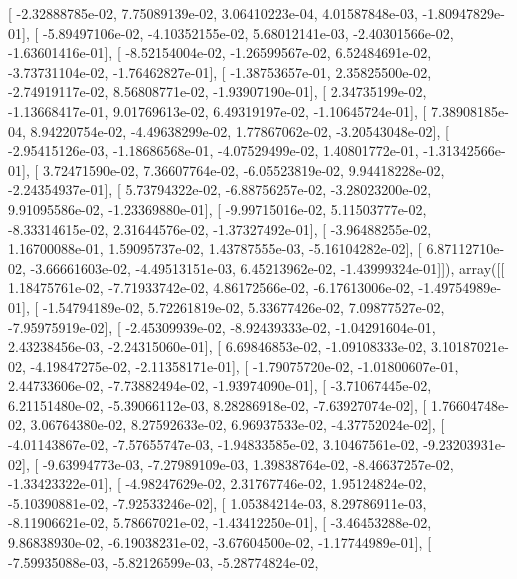 \documentclass{article}
\begin{document}
       [ -2.32888785e-02,   7.75089139e-02,   3.06410223e-04,
          4.01587848e-03,  -1.80947829e-01],
       [ -5.89497106e-02,  -4.10352155e-02,   5.68012141e-03,
         -2.40301566e-02,  -1.63601416e-01],
       [ -8.52154004e-02,  -1.26599567e-02,   6.52484691e-02,
         -3.73731104e-02,  -1.76462827e-01],
       [ -1.38753657e-01,   2.35825500e-02,  -2.74919117e-02,
          8.56808771e-02,  -1.93907190e-01],
       [  2.34735199e-02,  -1.13668417e-01,   9.01769613e-02,
          6.49319197e-02,  -1.10645724e-01],
       [  7.38908185e-04,   8.94220754e-02,  -4.49638299e-02,
          1.77867062e-02,  -3.20543048e-02],
       [ -2.95415126e-03,  -1.18686568e-01,  -4.07529499e-02,
          1.40801772e-01,  -1.31342566e-01],
       [  3.72471590e-02,   7.36607764e-02,  -6.05523819e-02,
          9.94418228e-02,  -2.24354937e-01],
       [  5.73794322e-02,  -6.88756257e-02,  -3.28023200e-02,
          9.91095586e-02,  -1.23369880e-01],
       [ -9.99715016e-02,   5.11503777e-02,  -8.33314615e-02,
          2.31644576e-02,  -1.37327492e-01],
       [ -3.96488255e-02,   1.16700088e-01,   1.59095737e-02,
          1.43787555e-03,  -5.16104282e-02],
       [  6.87112710e-02,  -3.66661603e-02,  -4.49513151e-03,
          6.45213962e-02,  -1.43999324e-01]]), array([[  1.18475761e-02,  -7.71933742e-02,   4.86172566e-02,
         -6.17613006e-02,  -1.49754989e-01],
       [ -1.54794189e-02,   5.72261819e-02,   5.33677426e-02,
          7.09877527e-02,  -7.95975919e-02],
       [ -2.45309939e-02,  -8.92439333e-02,  -1.04291604e-01,
          2.43238456e-03,  -2.24315060e-01],
       [  6.69846853e-02,  -1.09108333e-02,   3.10187021e-02,
         -4.19847275e-02,  -2.11358171e-01],
       [ -1.79075720e-02,  -1.01800607e-01,   2.44733606e-02,
         -7.73882494e-02,  -1.93974090e-01],
       [ -3.71067445e-02,   6.21151480e-02,  -5.39066112e-03,
          8.28286918e-02,  -7.63927074e-02],
       [  1.76604748e-02,   3.06764380e-02,   8.27592633e-02,
          6.96937533e-02,  -4.37752024e-02],
       [ -4.01143867e-02,  -7.57655747e-03,  -1.94833585e-02,
          3.10467561e-02,  -9.23203931e-02],
       [ -9.63994773e-03,  -7.27989109e-03,   1.39838764e-02,
         -8.46637257e-02,  -1.33423322e-01],
       [ -4.98247629e-02,   2.31767746e-02,   1.95124824e-02,
         -5.10390881e-02,  -7.92533246e-02],
       [  1.05384214e-03,   8.29786911e-03,  -8.11906621e-02,
          5.78667021e-02,  -1.43412250e-01],
       [ -3.46453288e-02,   9.86838930e-02,  -6.19038231e-02,
         -3.67604500e-02,  -1.17744989e-01],
       [ -7.59935088e-03,  -5.82126599e-03,  -5.28774824e-02,
\end{document}
